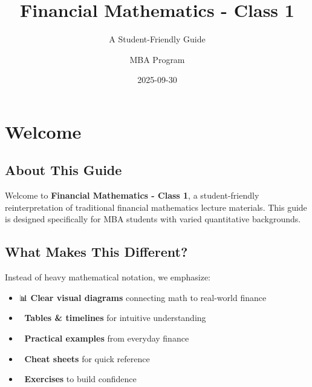 \documentclass[
  letterpaper,
]{scrbook}
\title{Financial Mathematics - Class 1}
\subtitle{A Student-Friendly Guide}
\author{MBA Program}
\date{2025-09-30}
\providecommand{\tightlist}{%
  \setlength{\itemsep}{0pt}\setlength{\parskip}{0pt}}
\renewcommand*\contentsname{Table of contents}
\newcommand\contentsname{Table of contents}
\begin{document}
\frontmatter
\maketitle

\renewcommand*\contentsname{Table of contents}
{
\setcounter{tocdepth}{2}
\tableofcontents
}

\mainmatter
{}

\chapter*{Welcome}\label{welcome}


\section*{About This Guide}\label{about-this-guide}


Welcome to \textbf{Financial Mathematics - Class 1}, a student-friendly
reinterpretation of traditional financial mathematics lecture materials.
This guide is designed specifically for MBA students with varied
quantitative backgrounds.

\section*{What Makes This Different?}\label{what-makes-this-different}


Instead of heavy mathematical notation, we emphasize:

\begin{itemize}
\tightlist
\item
  📊 \textbf{Clear visual diagrams} connecting math to real-world
  finance
\item
  📅 \textbf{Tables \& timelines} for intuitive understanding
\item
  📝 \textbf{Practical examples} from everyday finance
\item
  🎯 \textbf{Cheat sheets} for quick reference
\item
  💪 \textbf{Exercises} to build confidence
\end{itemize}
\end{document}
